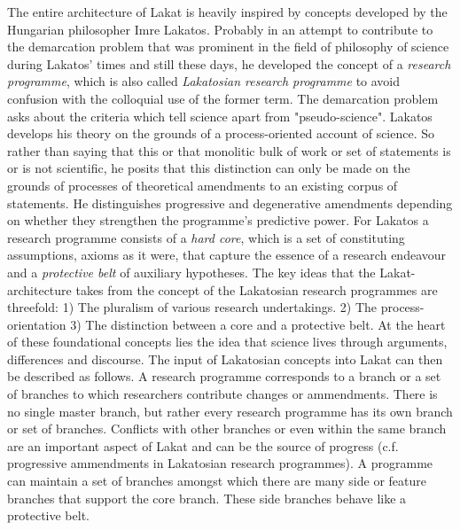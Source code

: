 \documentclass[14pt]{article}
\begin{document}


The entire architecture of Lakat is heavily inspired by concepts developed by the Hungarian philosopher Imre Lakatos. Probably in an attempt to contribute to the demarcation problem that was prominent in the field of philosophy of science during Lakatos' times and still these days, he developed the concept of a \textit{research programme}, which is also called \textit{Lakatosian research programme} to avoid confusion with the colloquial use of the former term. The demarcation problem asks about the criteria which tell science apart from "pseudo-science".  Lakatos develops his theory on the grounds of a process-oriented account of science. So rather than saying that this or that monolitic bulk of work or set of statements is or is not scientific, he posits that this distinction can only be made on the grounds of processes of theoretical amendments to an existing corpus of statements. He distinguishes progressive and degenerative amendments depending on whether they strengthen the programme's predictive power. For Lakatos a research programme consists of a \textit{hard core}, which is a set of constituting assumptions, axioms as it were, that capture the essence of a research endeavour and a \textit{protective belt} of auxiliary hypotheses. The key ideas that the Lakat-architecture takes from the concept of the Lakatosian research programmes are threefold: 1) The pluralism of various research undertakings. 2) The process-orientation 3) The distinction between a core and a protective belt. At the heart of these foundational concepts lies the idea that science lives through arguments, differences and discourse. The input of Lakatosian concepts into Lakat can then be described as follows. A research programme corresponds to a branch or a set of branches to which researchers contribute changes or ammendments. There is no single master branch, but rather every research programme has its own branch or set of branches. Conflicts with other branches or even within the same branch are an important aspect of Lakat and can be the source of progress (c.f. progressive ammendments in Lakatosian research programmes). A programme can maintain a set of branches amongst which there are many side or feature branches that support the core branch. These side branches behave like a protective belt.  
% 
% 
\end{document}
